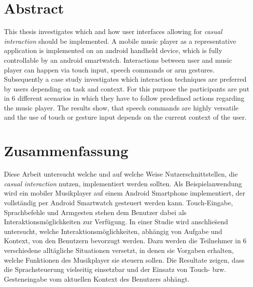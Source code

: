 \begingroup
\let\clearpage\relax
\let\cleardoublepage\relax
\let\cleardoublepage\relax

\chapter*{Abstract}
This thesis investigates which and how user interfaces allowing for \textit{casual interaction} should be implemented. A mobile music player as a representative application is implemented on an android handheld device, which is fully controllable by an android smartwatch. Interactions between user and music player can happen via touch input, speech commands or arm gestures. Subsequently a case study investigates which interaction techniques are preferred by users depending on task and context. For this purpose the participants are put in 6 different scenarios in which they have to follow predefined actions regarding the music player. The results show, that speech commands are highly versatile and the use of touch or gesture input depends on the current context of the user.


\vfill

\chapter*{Zusammenfassung}
Diese Arbeit untersucht welche und auf welche Weise Nutzerschnittstellen, die \textit{casual interaction} nutzen, implementiert werden sollten. Als Beispielanwendung wird ein mobiler Musikplayer auf einem Android Smartphone implementiert, der vollst\"andig per Android Smartwatch gesteuert werden kann. Touch-Eingabe, Sprachbefehle und Armgesten stehen dem Benutzer dabei als Interaktionsm\"oglichkeiten zur Verf\"ugung. In einer Studie wird anschlie\"send untersucht, welche Interaktionsm\"oglichkeiten, abh\"angig von Aufgabe und Kontext, von den Benutzern bevorzugt werden. Dazu werden die Teilnehmer in 6 verschiedene allt\"agliche Situationen versetzt, in denen sie Vorgaben erhalten, welche Funktionen des Musikplayer sie steuern sollen. Die Resultate zeigen, dass die Sprachsteuerung vielseitig einsetzbar und der Einsatz von Touch- bzw. Gesteneingabe vom aktuellen Kontext des Benutzers abhängt.


\endgroup			

\vfill